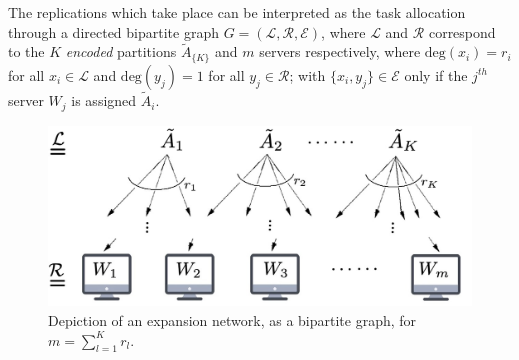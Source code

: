 \documentclass[journal,letterpaper,onecolumn,twoside,nofonttune]{IEEEtran}
\newcommand{\At}{\tilde{A}}
\begin{document}
The replications which take place can be interpreted as the task allocation through a directed bipartite graph $G=(\mathcal{L},\mathcal{R},\mathcal{E})$, where $\mathcal{L}$ and $\mathcal{R}$ correspond to the $K$ \textit{encoded} partitions $\At_{\{K\}}$ and $m$ servers respectively, where $\text{deg}(x_i)=r_i$ for all $x_i\in\mathcal{L}$ and $\text{deg}(y_j)=1$ for all $y_j\in\mathcal{R}$; with $\{x_i,y_j\}\in\mathcal{E}$ only if the $j^{th}$ server $W_j$ is assigned $\At_i$.
\begin{figure}[h]
  \centering
  \label{bip_exp_network}
  \includegraphics[scale=.2]{expansion_bipartite_graph_itlaic.png}
  \caption{Depiction of an expansion network, as a bipartite graph, for $m=\sum_{l=1}^Kr_l$.}
\end{figure}
\end{document}
